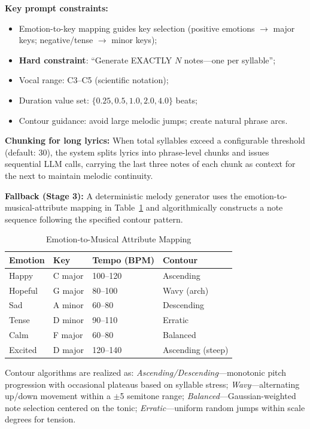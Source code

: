 \documentclass[conference]{IEEEtran}
\begin{document}
\textbf{Key prompt constraints:}
\begin{itemize}
  \item Emotion-to-key mapping guides key selection (positive emotions $\to$
        major keys; negative/tense $\to$ minor keys);
  \item \textbf{Hard constraint}: ``Generate EXACTLY $N$ notes---one per syllable'';
  \item Vocal range: C3--C5 (scientific notation);
  \item Duration value set: $\{0.25, 0.5, 1.0, 2.0, 4.0\}$ beats;
  \item Contour guidance: avoid large melodic jumps; create natural phrase arcs.
\end{itemize}

\textbf{Chunking for long lyrics:} When total syllables exceed a configurable
threshold (default: 30), the system splits lyrics into phrase-level chunks and
issues sequential LLM calls, carrying the last three notes of each chunk as
context for the next to maintain melodic continuity.

\textbf{Fallback (Stage 3):} A deterministic melody generator uses the
emotion-to-musical-attribute mapping in Table~\ref{tab:emotion_mapping} and
algorithmically constructs a note sequence following the specified contour
pattern.

\begin{table}[htbp]
\caption{Emotion-to-Musical Attribute Mapping}
\label{tab:emotion_mapping}
\centering
\begin{tabular}{@{}llll@{}}
\toprule
\textbf{Emotion} & \textbf{Key} & \textbf{Tempo (BPM)} & \textbf{Contour} \\
\midrule
Happy      & C major & 100--120 & Ascending \\
Hopeful    & G major & 80--100  & Wavy (arch) \\
Sad        & A minor & 60--80   & Descending \\
Tense      & D minor & 90--110  & Erratic \\
Calm       & F major & 60--80   & Balanced \\
Excited    & D major & 120--140 & Ascending (steep) \\
\bottomrule
\end{tabular}
\end{table}

Contour algorithms are realized as: \textit{Ascending/Descending}---monotonic
pitch progression with occasional plateaus based on syllable stress;
\textit{Wavy}---alternating up/down movement within a $\pm$5 semitone range;
\textit{Balanced}---Gaussian-weighted note selection centered on the tonic;
\textit{Erratic}---uniform random jumps within scale degrees for tension.
\end{document}

